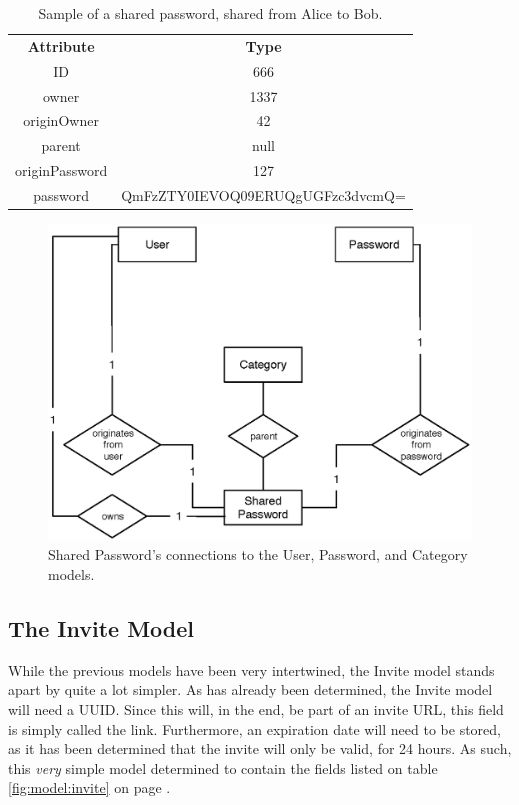 			\begin{table}[p]
				\centering
				\begin{tabular}{c|c}
					\textbf{Attribute} 		& \textbf{Type} 											\\
					ID 						& 666 														\\
					owner 					& 1337 														\\
					originOwner 			& 42 														\\
					parent 					& null 														\\
					originPassword			& 127 														\\
					password				& QmFzZTY0IEVOQ09ERUQgUGFzc3dvcmQ= 							\\
				\end{tabular}
				\caption{Sample of a shared password, shared from Alice to Bob.}
				\label{fig:example:sharedpassword:sampleshare}
			\end{table}

			\begin{figure}[p]
				\centering
				\includegraphics[scale=0.75]{figures/design/uml/erd/user-category-password-sharedpassword.eps}
				\caption{Shared Password's connections to the User, Password, and Category models.}
				\label{fig:relationship:sharedpassword}
			\end{figure}

		\subsection{The Invite Model}
			While the previous models have been very intertwined, the Invite model stands apart by quite a lot simpler. As has already been determined, the Invite model will need a UUID. Since this will, in the end, be part of an invite URL, this field is simply called the link. Furthermore, an expiration date will need to be stored, as it has been determined that the invite will only be valid, for 24 hours. As such, this \emph{very} simple model determined to contain the fields listed on table \ref{fig:model:invite} on page \pageref{fig:model:invite}. 
			
